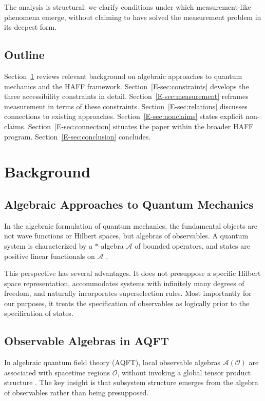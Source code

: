 \documentclass[12pt,a4paper,openany]{book}
\begin{document}
The analysis is structural: we clarify conditions under which measurement-like phenomena emerge, without claiming to have solved the measurement problem in its deepest form.

\subsection{Outline}

Section~\ref{E-sec:background} reviews relevant background on algebraic approaches to quantum mechanics and the HAFF framework. Section~\ref{E-sec:constraints} develops the three accessibility constraints in detail. Section~\ref{E-sec:measurement} reframes measurement in terms of these constraints. Section~\ref{E-sec:relations} discusses connections to existing approaches. Section~\ref{E-sec:nonclaims} states explicit non-claims. Section~\ref{E-sec:connection} situates the paper within the broader HAFF program. Section~\ref{E-sec:conclusion} concludes.

\section{Background}
\label{E-sec:background}

\subsection{Algebraic Approaches to Quantum Mechanics}

In the algebraic formulation of quantum mechanics, the fundamental objects are not wave functions or Hilbert spaces, but algebras of observables. A quantum system is characterized by a $*$-algebra $\mathcal{A}$ of bounded operators, and states are positive linear functionals on $\mathcal{A}$ \cite{Haag1996,Araki1999}.

This perspective has several advantages. It does not presuppose a specific Hilbert space representation, accommodates systems with infinitely many degrees of freedom, and naturally incorporates superselection rules. Most importantly for our purposes, it treats the specification of observables as logically prior to the specification of states.

\subsection{Observable Algebras in AQFT}

In algebraic quantum field theory (AQFT), local observable algebras $\mathcal{A}(\mathcal{O})$ are associated with spacetime regions $\mathcal{O}$, without invoking a global tensor product structure \cite{Haag1996}. The key insight is that subsystem structure emerges from the algebra of observables rather than being presupposed.
\end{document}
